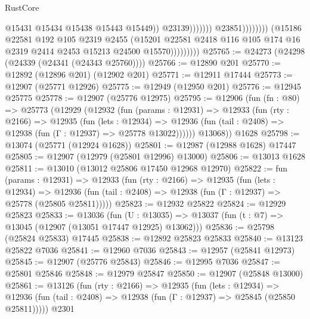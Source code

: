 \begin{lexlean}{RustCore}
\begin{coremodule}
                                                    @15431
                                                    @15434
                                                    @15438
                                                    @15443
                                                    @15449))
                                                @23139)))))))
                                  @23851))))))))
                  (@15186
                    @22581
                    @192
                    @105
                    @2319
                    @2455
                    (@15201
                      @22581
                      @2418
                      @116
                      @105
                      @174
                      @16
                      @2319
                      @2414
                      @2453
                      @15213
                      @24500
                      @15570)))))))))
@25765 := @24273 (@24298 (@24339 (@24341 (@24343 @25760))))
@25766 := @12890 @201
@25770 := @12892 (@12896 @201) (@12902 @201)
@25771 := @12911 @17444
@25773 := @12907 (@25771 @12926)
@25775 := @12949 (@12950 @201)
@25776 := @12945 @25775
@25778 := @12907 (@25776 @12975)
@25795 := @12906
    (fun (fn : @80) =>
    @25773
      (@12929
        (@12932
          (fun (params : @12931) =>
          @12933
            (fun (rty : @2166) =>
            @12935
              (fun (lets : @12934) =>
              @12936 (fun (tail : @2408) => @12938 (fun (Γ : @12937) => @25778 @13022))))))
        @13068))
    @1628
@25798 := @13074 (@25771 (@12924 @1628))
@25801 := @12987 (@12988 @1628) @17447
@25805 := @12907 (@12979 (@25801 @12996) @13000)
@25806 := @13013 @1628
@25811 := @13010 (@13012 @25806 @17450 @12968 @12970)
@25822 := fun (params : @12931) =>
  @12933
    (fun (rty : @2166) =>
    @12935
      (fun (lets : @12934) =>
      @12936 (fun (tail : @2408) => @12938 (fun (Γ : @12937) => @25778 (@25805 @25811)))))
@25823 := @12932 @25822
@25824 := @12929 @25823
@25833 := @13036
    (fun (U : @13035) => @13037 (fun (t : @7) => @13045 (@12907 (@13051 @17447 @12925) @13062)))
@25836 := @25798 (@25824 @25833) @17445
@25838 := @12892 @25823 @25833
@25840 := @13123 @25822 @7036
@25841 := @12960 @7036
@25843 := @12957 (@25841 @12973)
@25845 := @12907 (@25776 @25843)
@25846 := @12995 @7036
@25847 := @25801 @25846
@25848 := @12979 @25847
@25850 := @12907 (@25848 @13000)
@25861 := @13126
    (fun (rty : @2166) =>
    @12935
      (fun (lets : @12934) =>
      @12936 (fun (tail : @2408) => @12938 (fun (Γ : @12937) => @25845 (@25850 @25811)))))
    @2301

\end{coremodule}
\end{lexlean}
